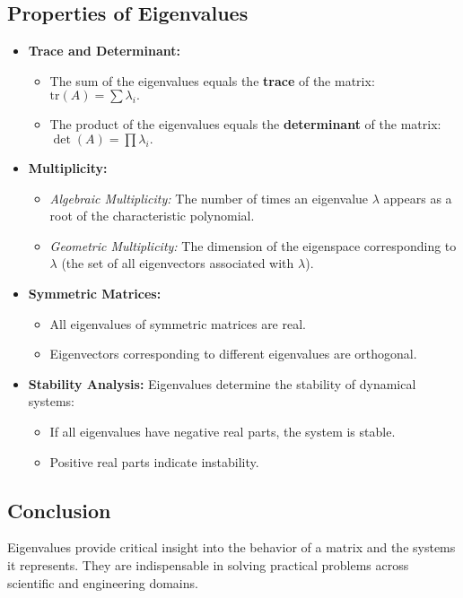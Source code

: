 \documentclass[12pt]{article}
\begin{document}
\subsection{Properties of Eigenvalues}
\begin{itemize}
    \item \textbf{Trace and Determinant:}
    \begin{itemize}
        \item The sum of the eigenvalues equals the \textbf{trace} of the matrix: $\text{tr}(A) = \sum \lambda_i.$
        \item The product of the eigenvalues equals the \textbf{determinant} of the matrix: $\det(A) = \prod \lambda_i.$
    \end{itemize}
    
    \item \textbf{Multiplicity:}
    \begin{itemize}
        \item \textit{Algebraic Multiplicity:} The number of times an eigenvalue $\lambda$ appears as a root of the characteristic polynomial.
        \item \textit{Geometric Multiplicity:} The dimension of the eigenspace corresponding to $\lambda$ (the set of all eigenvectors associated with $\lambda$).
    \end{itemize}
    
    \item \textbf{Symmetric Matrices:}
    \begin{itemize}
        \item All eigenvalues of symmetric matrices are real.
        \item Eigenvectors corresponding to different eigenvalues are orthogonal.
    \end{itemize}
    
    \item \textbf{Stability Analysis:}
    Eigenvalues determine the stability of dynamical systems:
    \begin{itemize}
        \item If all eigenvalues have negative real parts, the system is stable.
        \item Positive real parts indicate instability.
    \end{itemize}
\end{itemize}

\subsection{Conclusion}
Eigenvalues provide critical insight into the behavior of a matrix and the systems it represents. They are indispensable in solving practical problems across scientific and engineering domains.
\end{document}
